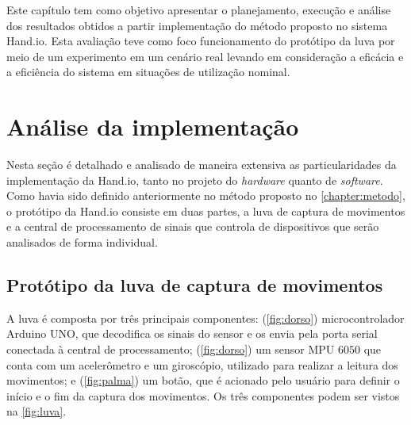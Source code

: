 \label{chapter:resultados}

Este capítulo tem como objetivo apresentar o planejamento, execução e análise dos resultados obtidos a partir implementação do método proposto no sistema Hand.io. Esta avaliação teve como foco funcionamento do protótipo da luva por meio de um experimento em um cenário real levando em consideração a eficácia e a eficiência do sistema em situações de utilização nominal.

\section{Análise da implementação}

Nesta seção é detalhado e analisado de maneira extensiva as particularidades da implementação da Hand.io, tanto no projeto do \textit{hardware} quanto de \textit{software}.
% 
% 
Como havia sido definido anteriormente no método proposto no \autoref{chapter:metodo}, o protótipo da Hand.io consiste em duas partes, a luva de captura de movimentos e a central de processamento de sinais que controla de dispositivos que serão analisados de forma individual.

\subsection{Protótipo da luva de captura de movimentos}

A luva é composta por três principais componentes: 
(\ref{fig:dorso}) microcontrolador Arduino UNO, que decodifica os sinais do sensor e os envia pela porta serial conectada à central de processamento; 
(\ref{fig:dorso}) um sensor MPU $6050$ que conta com um acelerômetro e um giroscópio, utilizado para realizar a leitura dos movimentos; e 
(\ref{fig:palma}) um botão, que é acionado pelo usuário para definir o início e o fim da captura dos movimentos. Os três componentes podem ser vistos na \autoref{fig:luva}.

